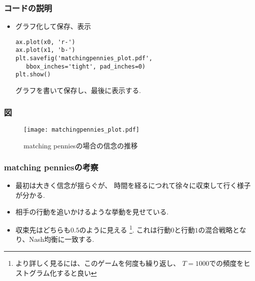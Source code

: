 \documentclass[dvipdfmx,fleqn]{beamer}
\begin{document}
\begin{frame}[containsverbatim]%
\frametitle{コードの説明}
\begin{itemize}\setlength{\parskip}{0.5em}

\item
グラフ化して保存、表示

\begin{verbatim}
ax.plot(x0, 'r-')
ax.plot(x1, 'b-')
plt.savefig('matchingpennies_plot.pdf', 
   bbox_inches='tight', pad_inches=0)
plt.show()
\end{verbatim}

グラフを書いて保存し、最後に表示する.

\end{itemize}
\end{frame}




\begin{frame}
\frametitle{図}
\begin{figure}
 \centering
 \texttt{[image: matchingpennies\_plot.pdf]}
 \caption{matching penniesの場合の信念の推移}
 \label{fig:matchingpennies_plot}
\end{figure}
\end{frame}



\begin{frame}
\frametitle{matching penniesの考察}
\begin{itemize}\setlength{\parskip}{0.5em}
\item
最初は大きく信念が揺らぐが、
時間を経るにつれて徐々に収束して行く様子が分かる.

\item
相手の行動を追いかけるような挙動を見せている.

\item
収束先はどちらも$0.5$のように見える
\footnote{より詳しく見るには、このゲームを何度も繰り返し、
$T=1000$での頻度をヒストグラム化すると良い}.
これは行動$0$と行動$1$の混合戦略となり、Nash均衡に一致する.

\end{itemize}
\end{frame}
\end{document}
